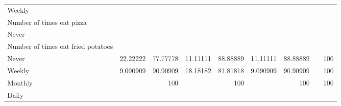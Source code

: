 \documentclass{article}
\begin{document}
\begin{tabular}{lllllllll}
\multicolumn{1}{l}{\hspace{3em}Weekly} &
  \multicolumn{1}{|r}{} &
  \multicolumn{1}{r}{} &
  \multicolumn{1}{r}{} &
  \multicolumn{1}{r}{} &
  \multicolumn{1}{r}{} &
  \multicolumn{1}{r}{} &
  \multicolumn{1}{r}{} &
  \multicolumn{1}{r}{} \\
\multicolumn{1}{l}{\hspace{4em}Number of times eat pizza} &
  \multicolumn{1}{|r}{} &
  \multicolumn{1}{r}{} &
  \multicolumn{1}{r}{} &
  \multicolumn{1}{r}{} &
  \multicolumn{1}{r}{} &
  \multicolumn{1}{r}{} &
  \multicolumn{1}{r}{} &
  \multicolumn{1}{r}{} \\
\multicolumn{1}{l}{\hspace{5em}Never} &
  \multicolumn{1}{|r}{} &
  \multicolumn{1}{r}{} &
  \multicolumn{1}{r}{} &
  \multicolumn{1}{r}{} &
  \multicolumn{1}{r}{} &
  \multicolumn{1}{r}{} &
  \multicolumn{1}{r}{} &
  \multicolumn{1}{r}{} \\
\multicolumn{1}{l}{\hspace{6em}Number of times eat fried potatoes} &
  \multicolumn{1}{|r}{} &
  \multicolumn{1}{r}{} &
  \multicolumn{1}{r}{} &
  \multicolumn{1}{r}{} &
  \multicolumn{1}{r}{} &
  \multicolumn{1}{r}{} &
  \multicolumn{1}{r}{} &
  \multicolumn{1}{r}{} \\
\multicolumn{1}{l}{\hspace{7em}Never} &
  \multicolumn{1}{|r}{22.22222} &
  \multicolumn{1}{r}{77.77778} &
  \multicolumn{1}{r}{11.11111} &
  \multicolumn{1}{r}{88.88889} &
  \multicolumn{1}{r}{11.11111} &
  \multicolumn{1}{r}{88.88889} &
  \multicolumn{1}{r}{} &
  \multicolumn{1}{r}{100} \\
\multicolumn{1}{l}{\hspace{7em}Weekly} &
  \multicolumn{1}{|r}{9.090909} &
  \multicolumn{1}{r}{90.90909} &
  \multicolumn{1}{r}{18.18182} &
  \multicolumn{1}{r}{81.81818} &
  \multicolumn{1}{r}{9.090909} &
  \multicolumn{1}{r}{90.90909} &
  \multicolumn{1}{r}{} &
  \multicolumn{1}{r}{100} \\
\multicolumn{1}{l}{\hspace{7em}Monthly} &
  \multicolumn{1}{|r}{} &
  \multicolumn{1}{r}{100} &
  \multicolumn{1}{r}{} &
  \multicolumn{1}{r}{100} &
  \multicolumn{1}{r}{} &
  \multicolumn{1}{r}{100} &
  \multicolumn{1}{r}{} &
  \multicolumn{1}{r}{100} \\
\multicolumn{1}{l}{\hspace{5em}Daily} &
  \multicolumn{1}{|r}{} &
  \multicolumn{1}{r}{} &
  \multicolumn{1}{r}{} &
  \multicolumn{1}{r}{} &

\end{tabular}
\end{document}
